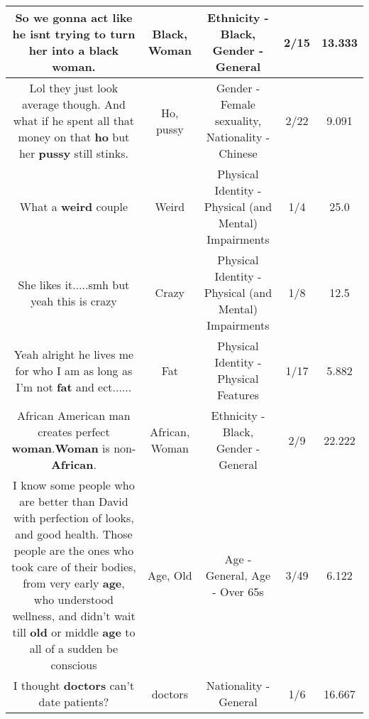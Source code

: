 \documentclass[11pt]{article}
\newlength\mylength
\begin{document}
\begin{center}
\begin{longtable}{|C{.65\mylength}|C{.30\mylength}|C{.12\mylength}|C{.12\mylength}|C{.12\mylength}|}
  \small So we gonna act like he isnt trying to turn her into a \textbf{black} \textbf{woman}.\normalsize   & Black, Woman & Ethnicity - Black, Gender - General & 2/15 & 13.333 \\  \hline
  \small Lol they just look average though. And what if he spent all that money on that \textbf{ho} but her \textbf{pussy} still stinks.\normalsize   & Ho, pussy & Gender - Female sexuality, Nationality - Chinese & 2/22 & 9.091 \\  \hline
  \small What a \textbf{weird} couple\normalsize   & Weird & Physical Identity - Physical (and Mental) Impairments & 1/4 & 25.0 \\  \hline
  \small She likes it.....smh but yeah this is crazy\normalsize   & Crazy & Physical Identity - Physical (and Mental) Impairments & 1/8 & 12.5 \\  \hline
  \small Yeah alright he lives me for who I am as long as I'm not \textbf{fat} and ect......\normalsize   & Fat & Physical Identity - Physical Features & 1/17 & 5.882 \\  \hline
  \small African American man creates perfect \textbf{woman}.\textbf{Woman} is non-\textbf{African}.\normalsize   & African, Woman & Ethnicity - Black, Gender - General & 2/9 & 22.222 \\  \hline
  \small I know some people who are better than David with perfection of looks, and good health. Those people are the ones who took care of their bodies, from very early \textbf{age}, who understood wellness, and didn't wait till \textbf{old} or middle \textbf{age} to all of a sudden be conscious\normalsize   & Age, Old & Age - General, Age - Over 65s & 3/49 & 6.122 \\  \hline
  \small I thought \textbf{doctors} can't date patients?\normalsize   & doctors & Nationality - General & 1/6 & 16.667 \\  \hline

\end{longtable}
\end{center}
\end{document}
